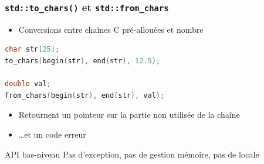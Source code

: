 \documentclass[C++.tex]{subfiles}
\begin{document}
\begin{frame}[fragile]
	\frametitle{\lstinline|std::to_chars()| et \lstinline|std::from_chars|}
	\begin{itemize}
		\item Conversions entre chaînes C pré-allouées et nombre
	\end{itemize}
	
	\begin{lstlisting}[language=C++]
char str[25];
to_chars(begin(str), end(str), 12.5);

double val;
from_chars(begin(str), end(str), val);\end{lstlisting}

	\begin{itemize}
		\item Retournent un pointeur sur la partie non utilisée de la chaîne


		\item \ldots et un code erreur
	\end{itemize}

	\begin{alertblock}{API bas-niveau}
		Pas d'exception, pas de gestion mémoire, pas de locale
	\end{alertblock}
\end{frame}
\end{document}
